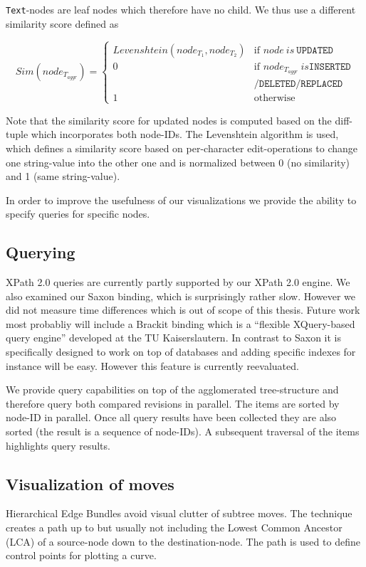 \texttt{Text}-nodes are leaf nodes which therefore have no child. We thus use a different similarity score defined as

\begin{equation}
Sim(node_{T_{aggr}}) = \left\{ \begin{array}{cl}
Levenshtein(node_{T_{1}}, node_{T_{2}}) & \textrm{if }node\ is\ \texttt{UPDATED}\\
0 & \textrm{if }node_{T_{aggr}}\ is \texttt{INSERTED}\\
  & \texttt{/DELETED/REPLACED}\\
1 & \textrm{otherwise}\end{array}\right.
\end{equation}

Note that the similarity score for updated nodes is computed based on the diff-tuple which incorporates both node-IDs. The Levenshtein algorithm is used, which defines a similarity score based on per-character edit-operations to change one string-value into the other one and is normalized between 0 (no similarity) and 1 (same string-value). 

In order to improve the usefulness of our visualizations we provide the ability to specify queries for specific nodes.

\subsection{Querying}
XPath 2.0 queries are currently partly supported by our XPath 2.0 engine. We also examined our Saxon\cite{Saxon} binding, which is surprisingly rather slow. However we did not measure time differences which is out of scope of this thesis. Future work most probabliy will include a Brackit\cite{Brackit} binding which is a ``flexible XQuery-based query engine'' developed at the TU Kaiserslautern. In contrast to Saxon it is specifically designed to work on top of databases and adding specific indexes for instance will be easy. However this feature is currently reevaluated.

We provide query capabilities on top of the agglomerated tree-structure and therefore query both compared revisions in parallel. The items are sorted by node-ID in parallel. Once all query results have been collected they are also sorted (the result is a sequence of node-IDs). A subsequent traversal of the items highlights query results.

\subsection{Visualization of moves}
Hierarchical Edge Bundles\cite{Bundles} avoid visual clutter of subtree moves. The technique creates a path up to but usually not including the Lowest Common Ancestor (LCA) of a source-node down to the destination-node. The path is used to define control points for plotting a curve.

